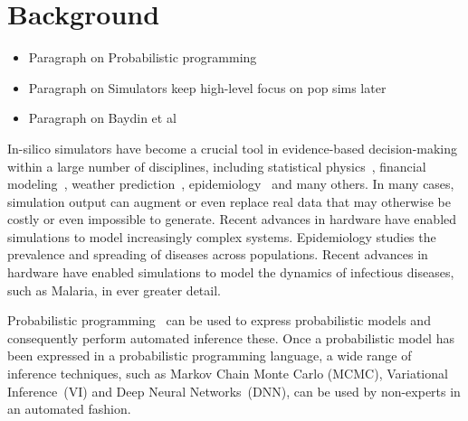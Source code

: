 \documentclass{article}
\begin{document}
\section{Background}
\label{sec:backgorund}

\begin{itemize}
\item Paragraph on Probabilistic programming
\item Paragraph on Simulators keep high-level focus on pop sims later
\item Paragraph on Baydin et al
\end{itemize}
In-silico simulators have become a crucial tool in evidence-based decision-making within a large number of disciplines, including statistical physics~\cite{landau_binder_2014}, financial modeling~\cite{jackel2002monte},
weather prediction~\cite{evensen1994sequential}, epidemiology~\cite{smith2008towards} and many others.
In many cases, simulation output can augment or even replace real data that may otherwise be costly or even impossible to generate.
Recent advances in hardware have enabled simulations to model increasingly complex systems.
Epidemiology studies the prevalence and spreading of diseases across populations. Recent advances in hardware have enabled simulations to model the dynamics of infectious diseases, such as Malaria, in ever greater detail.

Probabilistic programming~\cite{gordon2014probabilistic,staton2016semantics,kozen1979semantics} 
can be used to express probabilistic models and consequently perform automated inference these. Once a probabilistic model has been expressed in a probabilistic programming language, a wide range of inference techniques, such as Markov Chain Monte Carlo (MCMC)\cite{geyer1992practical}, Variational Inference~(VI)\cite{wainwright2008graphical} and Deep Neural Networks~(DNN)\cite{Goodfellow:2016:DL:3086952},  can be used by non-experts in an automated fashion. 
 




\end{document}
